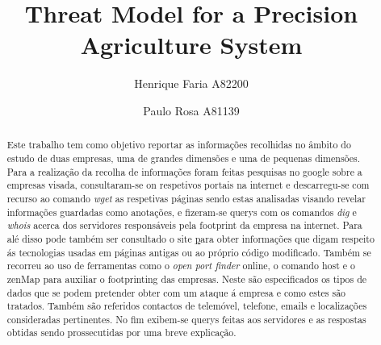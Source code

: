 

\title{Threat Model for a Precision Agriculture System}

\author{Henrique Faria A82200 \and Paulo Rosa A81139}




\maketitle

\begin{abstract}
Este trabalho tem como objetivo reportar as informações recolhidas no âmbito do estudo de duas empresas, uma de grandes dimensões e uma de pequenas dimensões.\newline
Para a realização da recolha de informações foram feitas pesquisas no google sobre a empresas visada, consultaram-se on respetivos portais na internet e descarregu-se com recurso ao comando \textit{wget} as respetivas páginas sendo estas analisadas visando revelar informações guardadas como anotações, e fizeram-se querys com os comandos \textit{dig} e \textit{whois} acerca dos servidores responsáveis pela footprint da empresa na internet. Para alé disso pode também ser consultado o site \href{https://web.archive.org} para obter informações que digam respeito ás tecnologias usadas em páginas antigas ou ao próprio código modificado.\newline  
Também se recorreu ao uso de ferramentas como o \textit{open port finder} online, o comando host e o zenMap para auxiliar o footprinting das empresas.
Neste são especificados os tipos de dados que se podem pretender obter com um ataque á empresa e como estes são tratados. Também são referidos contactos de telemóvel, telefone, emails e localizações consideradas pertinentes. No fim exibem-se querys feitas aos servidores e as respostas obtidas sendo prossecutidas por uma breve explicação. 

\end{abstract}
\newpage
